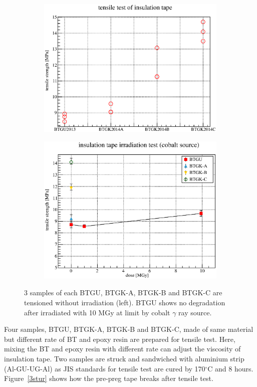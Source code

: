  \begin{figure}[H]
  \begin{subfigure}{0.3\textwidth}
   \centering
   \includegraphics[scale=0.43]{chapter4/fig/gubt.eps}
  \end{subfigure}
  \hspace{0.2\textwidth}
  \begin{subfigure}{0.3\textwidth}
   \centering
   \includegraphics[scale=0.43]{chapter4/fig/BTGU2.eps}
  \end{subfigure}
  \caption{3 samples of each BTGU, BTGK-A, BTGK-B and BTGK-C are tensioned without irradiation (left). BTGU shows no degradation after irradiated with 10 MGy at limit by cobalt $\gamma$ ray source.}
  \label{3gubt}
 \end{figure}
Four samples, BTGU, BTGK-A, BTGK-B and BTGK-C, made of same material but different rate of BT and epoxy resin are prepared for tensile test.
Here, mixing the BT and epoxy resin with different rate can adjust the viscosity of insulation tape.
Two samples are struck and sandwiched with aluminium strip (Al-GU-UG-Al) as JIS standards for tensile test are cured by 170$^{\circ}$C and 8 hours.
Figure~\ref{3stur} shows how the pre-preg tape breaks after tensile test.

